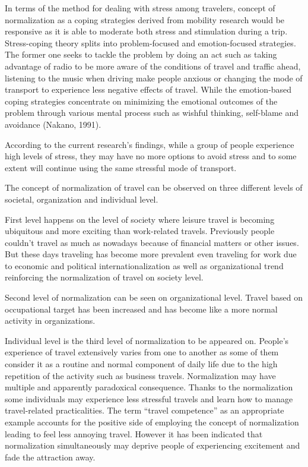\documentclass[
11pt, %
oneside, %
english, %
singlespacing, %
]{macthesis} %
\begin{document}
In terms of the method for dealing with stress among travelers, concept of normalization as a coping strategies derived from mobility research would be responsive as it is able to moderate both stress and stimulation during a trip. Stress-coping theory splits into problem-focused and emotion-focused strategies. The former one seeks to tackle the problem by doing an act such as taking advantage of radio to be more aware of the conditions of travel and traffic ahead, listening to the music when driving make people anxious or changing the mode of transport to experience less negative effects of travel. While the emotion-based coping strategies concentrate on minimizing the emotional outcomes of the problem through various mental process such as wishful thinking, self-blame and avoidance (Nakano, 1991).

According to the current research's findings, while a group of people experience high levels of stress, they may have no more options to avoid stress and to some extent will continue using the same stressful mode of transport.

The concept of normalization of travel can be observed on three different levels of societal, organization and individual level.

First level happens on the level of society where leisure travel is becoming ubiquitous and more exciting than work-related travels. Previously people couldn't travel as much as nowadays because of financial matters or other issues. But these days traveling has become more prevalent even traveling for work due to economic and political internationalization as well as organizational trend reinforcing the normalization of travel on society level.

Second level of normalization can be seen on organizational level. Travel based on occupational target has been increased and has become like a more normal activity in organizations.

Individual level is the third level of normalization to be appeared on. People's experience of travel extensively varies from one to another as some of them consider it as a routine and normal component of daily life due to the high repetition of the activity such as business travels. Normalization may have multiple and apparently paradoxical consequence. Thanks to the normalization some individuals may experience less stressful travels and learn how to manage travel-related practicalities. The term ``travel competence'' as an appropriate example accounts for the positive side of employing the concept of normalization leading to feel less annoying travel. However it has been indicated that normalization simultaneously may deprive people of experiencing excitement and fade the attraction away.
\end{document}
